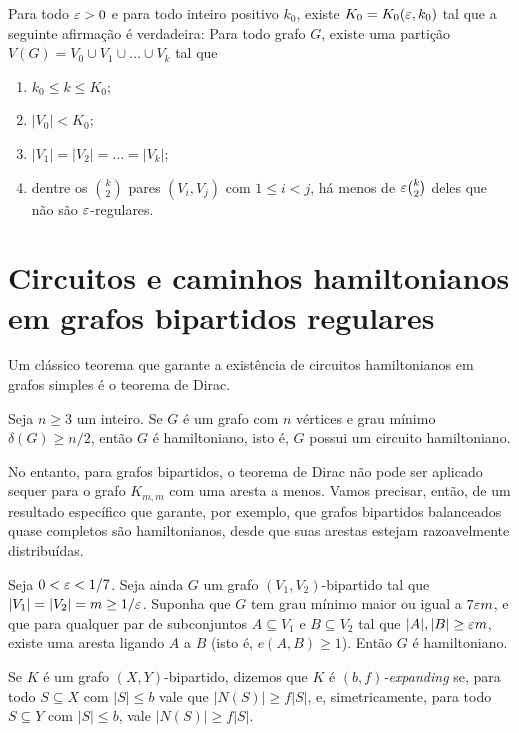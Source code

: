 \begin{lema}
	Para todo $\varepsilon>0$ e para todo inteiro positivo $k_0$, existe $K_0 = K_0(\varepsilon,k_0)$ tal que a seguinte afirmação é verdadeira: Para todo grafo $G$, existe uma partição $V(G) = V_0\cup V_1\cup\dots\cup V_k$ tal que 
	\begin{enumerate}
		\item $k_0\leq k\leq K_0$;
		\item $|V_0| < K_0$;
		\item $|V_1| = |V_2| = \dots = |V_k|$;
		\item dentre os $k\choose 2$ pares $(V_i, V_j)$ com $1\leq i<j$, há menos de $\varepsilon {k\choose 2}$ deles que não são $\varepsilon$-regulares.
	\end{enumerate}
\end{lema}

\section{Circuitos e caminhos hamiltonianos em grafos bipartidos regulares}

Um clássico teorema que garante a existência de circuitos hamiltonianos em grafos simples é o teorema de Dirac.

\begin{teo}[Dirac]
	Seja $n\geq3$ um inteiro. Se $G$ é um grafo com $n$ vértices e grau mínimo $\delta(G)\geq n/2$, então $G$ é hamiltoniano, isto é, $G$ possui um circuito hamiltoniano.
\end{teo}

No entanto, para grafos bipartidos, o teorema de Dirac não pode ser aplicado sequer para o grafo $K_{m,m}$ com uma aresta a menos. Vamos precisar, então, de um resultado específico que garante, por exemplo, que grafos bipartidos balanceados quase completos são hamiltonianos, desde que suas arestas estejam razoavelmente distribuídas.

\begin{lema}\label{lema:haxell}
	Seja $0<\varepsilon<1/7$. Seja ainda $G$ um grafo $(V_1, V_2)$-bipartido tal que $|V_1| = |V_2| = m\geq1/\varepsilon$. Suponha que $G$ tem grau mínimo maior ou igual a $7\varepsilon m$, e que para qualquer par de subconjuntos $A\subseteq V_1$ e $B\subseteq V_2$ tal que $|A|,|B|\geq \varepsilon m$, existe uma aresta ligando $A$ a $B$ (isto é, $e(A, B)\geq1$). Então $G$ é hamiltoniano.
\end{lema}

\begin{defi}
	Se $K$ é um grafo $(X,Y)$-bipartido, dizemos que $K$ é \emph{$(b,f)$-expanding} se, para todo $S\subseteq X$ com $|S|\leq b$ vale que $|N(S)|\geq f|S|$, e, simetricamente, para todo $S\subseteq Y$ com $|S|\leq b$, vale $|N(S)|\geq f|S|$.
\end{defi}


